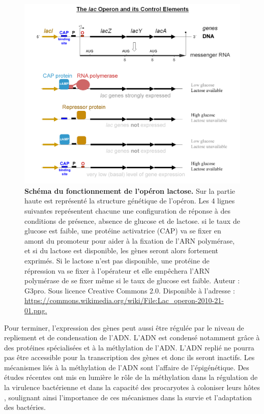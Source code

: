 \begin{figure}[htbp]
    \centering
    \includegraphics[width=\linewidth]{images/Lac_operon-2010-21-01.png}
    \caption[Exemple de l'opéron lactose]{\textbf{Schéma du fonctionnement de l'opéron lactose.} Sur la partie haute est représenté la structure génétique de l'opéron. Les 4 lignes suivantes représentent chacune une configuration de réponse à des conditions de présence, absence de glucose et de lactose. si le taux de glucose est faible, une protéine activatrice (CAP) va se fixer en amont du promoteur pour aider à la fixation de l'ARN polymérase, et si du lactose est disponible, les gènes seront alors fortement exprimés. Si le lactose n'est pas disponible, une protéine de répression va se fixer à l'opérateur et elle empêchera l'ARN polymérase de se fixer même si le taux de glucose est faible. 
    Auteur : G3pro. Sous licence Creative Commons 2.0. Disponible à l’adresse : \url{https://commons.wikimedia.org/wiki/File:Lac_operon-2010-21-01.png.}
    }
    \label{fig:lac_operon}
\end{figure}

Pour terminer, l'expression des gènes peut aussi être régulée par le niveau de repliement et de condensation de l'ADN. L'ADN est condensé notamment grâce à des protéines spécialisées et à la méthylation de l’ADN. L'ADN replié ne pourra pas être accessible pour la transcription des gènes et donc ils seront inactifs. Les mécanismes liés à la méthylation de l'ADN sont l'affaire de l’épigénétique. Des études récentes ont mis en lumière le rôle de la méthylation dans la régulation de la virulence bactérienne et dans la capacité des procaryotes à coloniser leurs hôtes \cite{oliveira_bacterial_2021}, soulignant ainsi l'importance de ces mécanismes dans la survie et l’adaptation des bactéries.

